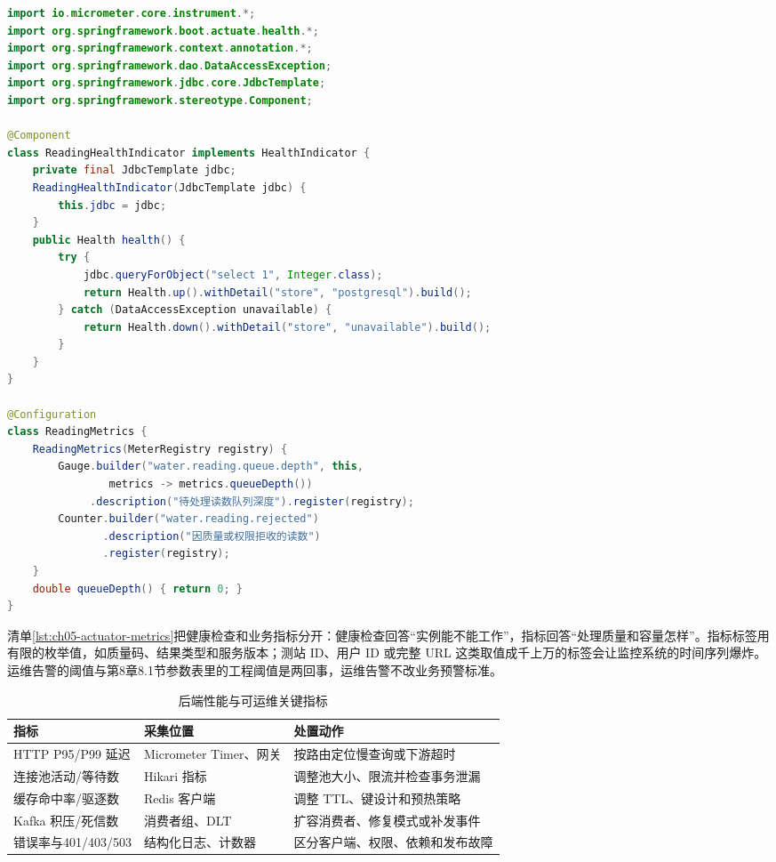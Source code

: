 \begin{lstlisting}[label={lst:ch05-actuator-metrics},language=Java,caption={Actuator 健康检查与 Micrometer 指标}]
import io.micrometer.core.instrument.*;
import org.springframework.boot.actuate.health.*;
import org.springframework.context.annotation.*;
import org.springframework.dao.DataAccessException;
import org.springframework.jdbc.core.JdbcTemplate;
import org.springframework.stereotype.Component;

@Component
class ReadingHealthIndicator implements HealthIndicator {
    private final JdbcTemplate jdbc;
    ReadingHealthIndicator(JdbcTemplate jdbc) {
        this.jdbc = jdbc;
    }
    public Health health() {
        try {
            jdbc.queryForObject("select 1", Integer.class);
            return Health.up().withDetail("store", "postgresql").build();
        } catch (DataAccessException unavailable) {
            return Health.down().withDetail("store", "unavailable").build();
        }
    }
}

@Configuration
class ReadingMetrics {
    ReadingMetrics(MeterRegistry registry) {
        Gauge.builder("water.reading.queue.depth", this,
                metrics -> metrics.queueDepth())
             .description("待处理读数队列深度").register(registry);
        Counter.builder("water.reading.rejected")
               .description("因质量或权限拒收的读数")
               .register(registry);
    }
    double queueDepth() { return 0; }
}
\end{lstlisting}

清单\ref{lst:ch05-actuator-metrics}把健康检查和业务指标分开：健康检查回答“实例能不能工作”，指标回答“处理质量和容量怎样”。指标标签用有限的枚举值，如质量码、结果类型和服务版本；测站 ID、用户 ID 或完整 URL 这类取值成千上万的标签会让监控系统的时间序列爆炸。运维告警的阈值与第8章8.1节参数表里的工程阈值是两回事，运维告警不改业务预警标准。

\begin{table}[htbp]
\centering
\small
\caption{后端性能与可运维关键指标}
\label{tab:ch05-observability-metrics}
\begin{tabular}{p{}p{}p{}}
\toprule
指标 & 采集位置 & 处置动作 \\
\midrule
HTTP P95/P99 延迟 & Micrometer Timer、网关 & 按路由定位慢查询或下游超时 \\
连接池活动/等待数 & Hikari 指标 & 调整池大小、限流并检查事务泄漏 \\
缓存命中率/驱逐数 & Redis 客户端 & 调整 TTL、键设计和预热策略 \\
Kafka 积压/死信数 & 消费者组、DLT & 扩容消费者、修复模式或补发事件 \\
错误率与401/403/503 & 结构化日志、计数器 & 区分客户端、权限、依赖和发布故障 \\
\bottomrule
\end{tabular}
\end{table}

